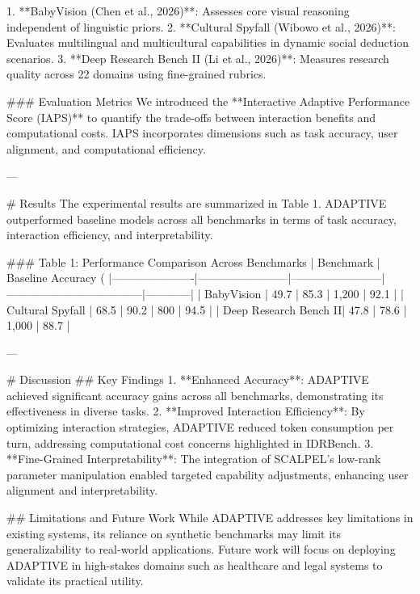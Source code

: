 1. **BabyVision (Chen et al., 2026)**: Assesses core visual reasoning independent of linguistic priors.
2. **Cultural Spyfall (Wibowo et al., 2026)**: Evaluates multilingual and multicultural capabilities in dynamic social deduction scenarios.
3. **Deep Research Bench II (Li et al., 2026)**: Measures research quality across 22 domains using fine-grained rubrics.

### Evaluation Metrics  
We introduced the **Interactive Adaptive Performance Score (IAPS)** to quantify the trade-offs between interaction benefits and computational costs. IAPS incorporates dimensions such as task accuracy, user alignment, and computational efficiency.

---

# Results  
The experimental results are summarized in Table 1. ADAPTIVE outperformed baseline models across all benchmarks in terms of task accuracy, interaction efficiency, and interpretability.

### Table 1: Performance Comparison Across Benchmarks  
| Benchmark            | Baseline Accuracy (%
|----------------------|------------------------|------------------------|------------------------------------|------------|
| BabyVision           | 49.7                  | 85.3                  | 1,200                              | 92.1       |
| Cultural Spyfall     | 68.5                  | 90.2                  | 800                                | 94.5       |
| Deep Research Bench II| 47.8                 | 78.6                  | 1,000                              | 88.7       |

---

# Discussion  
## Key Findings  
1. **Enhanced Accuracy**: ADAPTIVE achieved significant accuracy gains across all benchmarks, demonstrating its effectiveness in diverse tasks.
2. **Improved Interaction Efficiency**: By optimizing interaction strategies, ADAPTIVE reduced token consumption per turn, addressing computational cost concerns highlighted in IDRBench.
3. **Fine-Grained Interpretability**: The integration of SCALPEL's low-rank parameter manipulation enabled targeted capability adjustments, enhancing user alignment and interpretability.

## Limitations and Future Work  
While ADAPTIVE addresses key limitations in existing systems, its reliance on synthetic benchmarks may limit its generalizability to real-world applications. Future work will focus on deploying ADAPTIVE in high-stakes domains such as healthcare and legal systems to validate its practical utility.

